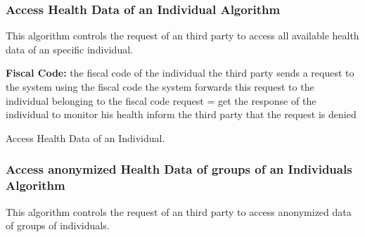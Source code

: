 \documentclass[12pt]{article}
\begin{document}
\newpage
\subsubsection{Access Health Data of an Individual Algorithm}

This algorithm controls the request of an third party to access all available health data of an 
specific individual.
\vspace{10mm}

\begin{algorithm}[H]
 \textbf{Fiscal Code:} the fiscal code of the individual\;
 \vspace{1mm}
 the third party sends a request to the system using the fiscal code\;\vspace{1mm}
 the system forwards this request to the individual belonging to the fiscal code\;\vspace{1mm}
 request = get the response of the individual to monitor his health\; \vspace{1mm}
    {    
    inform the third party that the request is denied\;   
    }  

    
 \vspace{5mm}
 \caption{Access Health Data of an Individual.}
\end{algorithm}


\newpage
\subsubsection{Access anonymized Health Data of groups of an Individuals Algorithm}

This algorithm controls the request of an third party to access anonymized data of groups of individuals.
\vspace{10mm}
\end{document}
